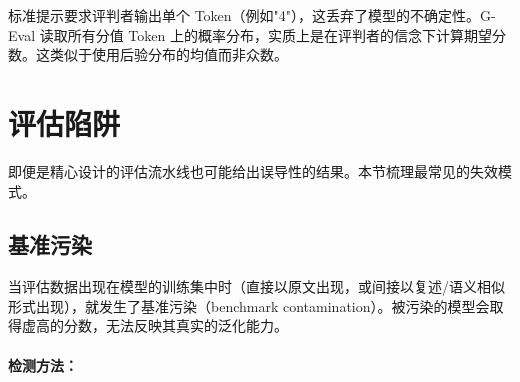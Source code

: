 \begin{intuitionbox}[为何 G-Eval 有效]
标准提示要求评判者输出单个 Token（例如"4"），这丢弃了模型的不确定性。G-Eval 读取所有分值 Token 上的概率分布，实质上是在评判者的信念下计算期望分数。这类似于使用后验分布的均值而非众数。
\end{intuitionbox}

\section{评估陷阱}
\label{subsec:eval-pitfalls}

即便是精心设计的评估流水线也可能给出误导性的结果。本节梳理最常见的失效模式。

\subsection{基准污染}
\label{benchmark-contamination}

当评估数据出现在模型的训练集中时（直接以原文出现，或间接以复述/语义相似形式出现），就发生了基准污染（benchmark contamination）。被污染的模型会取得虚高的分数，无法反映其真实的泛化能力。

\paragraph{检测方法：}
\label{detection-methods}


